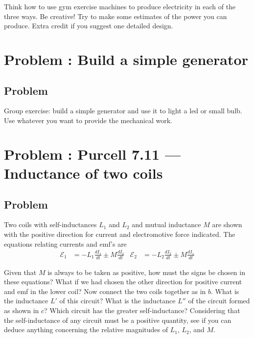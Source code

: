 \documentclass[solutions]{esg8022pset}
\begin{document}
  Think how to use gym exercise machines to produce electricity in each of the
  three ways. Be creative!
  Try to make some estimates of the power you can produce. Extra credit if you
  suggest one detailed design.
\section{Problem \thesection: Build a simple generator}
\subsection{Problem}
  Group exercise: build a simple generator and use it to light a led or small
  bulb. Use whatever you want to provide the mechanical work.
\section{Problem \thesection: Purcell 7.11 --- Inductance of two coils}
\subsection{Problem}
  Two coils with self-inductances $L_1$ and $L_2$ and mutual inductance $M$
  are shown with the positive direction for current and electromotive force
  indicated. The equations relating currents and emf's are
  \begin{align*}
    \mathcal{E}_1 & = -L_1\frac{dI_1}{dt}\pm M\frac{dI_2}{dt}
    & \mathcal{E}_2 & = -L_2\frac{dI_2}{dt}\pm M\frac{dI_1}{dt}
  \end{align*}

  Given that $M$ is always to be taken as positive, how must the signs be
  chosen in these equations? What if we had chosen the other direction for
  positive current and emf in the lower coil? Now connect the two coils
  together as in $b$. What is the inductance $L'$ of this circuit? What is the
  inductance $L''$ of the circuit formed as shown in $c$? Which circuit has the
  greater self-inductance? Considering that the self-inductance of any circuit
  must be a positive quantity, see if you can deduce anything concerning the
  relative magnitudes of $L_1$, $L_2$, and $M$.
\end{document}

